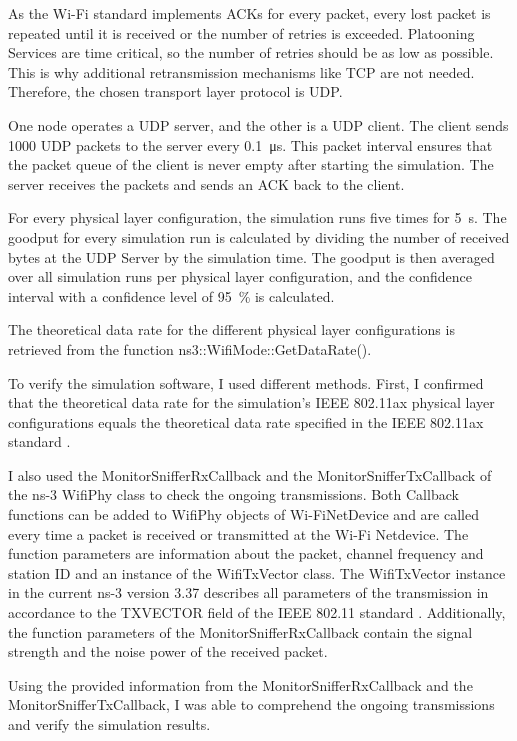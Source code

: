 As the Wi-Fi standard implements ACKs for every packet, every lost packet is repeated until it is received or the number of retries is
exceeded.
Platooning Services are time critical, so the number of retries should be as low as possible.
This is why additional retransmission mechanisms like TCP are not needed.
Therefore, the chosen transport layer protocol is UDP.

One node operates a \ac{UDP} server, and the other is a \ac{UDP} client.
The client sends \SI{1000}{\byte} \ac{UDP} packets to the server every \SI{0.1}{\micro\second}.
This packet interval
ensures that the packet queue of the client is never empty after starting the simulation.
The server receives the packets and sends an ACK back to the client.

For every physical layer configuration, the simulation runs five times for \SI{5}{\second}.
The goodput for every simulation run is calculated by dividing the number of received bytes at the \ac{UDP} Server by the simulation time.
The goodput is then averaged over all simulation runs per physical layer configuration, and the confidence interval with a confidence level of
\SI{95}{\percent} is calculated.

The theoretical data rate for the different physical layer configurations is retrieved from the function ns3::WifiMode::GetDataRate().

To verify the simulation software, I used different methods.
First, I confirmed that the theoretical data rate for the simulation's IEEE 802.11ax physical layer configurations equals the theoretical data rate specified in the IEEE 802.11ax standard \cite{ieee_standard_2021ax}.

I also used the MonitorSnifferRxCallback and the MonitorSnifferTxCallback of the ns-3 WifiPhy class to check the ongoing transmissions.
Both Callback functions can be added to WifiPhy objects of Wi-FiNetDevice and are called every time a packet is received or transmitted at the Wi-Fi Netdevice.
The function parameters are information about the packet, channel frequency and station ID and an instance of the WifiTxVector class.
The WifiTxVector instance in the current ns-3 version 3.37 describes all parameters of the transmission in accordance to the TXVECTOR field of the IEEE 802.11 standard \cite{ieee_standard_2021ax}. Additionally, the function parameters of the MonitorSnifferRxCallback contain the signal strength and
the noise power of the received packet.

Using the provided information from the MonitorSnifferRxCallback and the MonitorSnifferTxCallback, I was able to comprehend the ongoing transmissions and
verify the simulation results.


